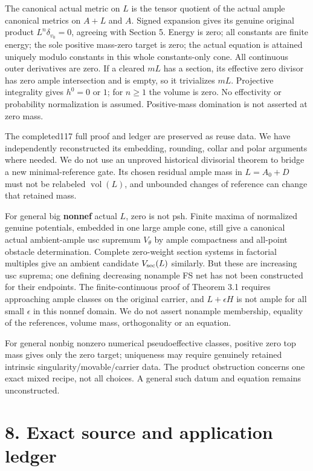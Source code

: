\documentclass[
  10pt,
]{article}
\begin{document}
The canonical actual metric on \(L\) is the tensor quotient of the
actual ample canonical metrics on \(A+L\) and \(A\). Signed expansion
gives its genuine original product \(L^n\delta_{v_0}=0\), agreeing with
Section 5. Energy is zero; all constants are finite energy; the sole
positive mass-zero target is zero; the actual equation is attained
uniquely modulo constants in this whole constants-only cone. All
continuous outer derivatives are zero. If a cleared \(mL\) has a
section, its effective zero divisor has zero ample intersection and is
empty, so it trivializes \(mL\). Projective integrality gives \(h^0=0\)
or \(1\); for \(n\ge1\) the volume is zero. No effectivity or
probability normalization is assumed. Positive-mass domination is not
asserted at zero mass.

The completed117 full proof and ledger are preserved as reuse data. We
have independently reconstructed its embedding, rounding, collar and
polar arguments where needed. We do not use an unproved historical
divisorial theorem to bridge a new minimal-reference gate. Its chosen
residual ample mass in \(L=A_0+D\) must not be relabeled
\(\operatorname{vol}(L)\), and unbounded changes of reference can change
that retained mass.

For general big \textbf{nonnef} actual \(L\), zero is not psh. Finite
maxima of normalized genuine potentials, embedded in one large ample
cone, still give a canonical actual ambient-ample usc supremum
\(V_\theta\) by ample compactness and all-point obstacle determination.
Complete zero-weight section systems in factorial multiples give an
ambient candidate \(V_{\rm sec}(L)\) similarly. But these are increasing
usc suprema; one defining decreasing nonample FS net has not been
constructed for their endpoints. The finite-continuous proof of Theorem
3.1 requires approaching ample classes on the original carrier, and
\(L+\epsilon H\) is not ample for all small \(\epsilon\) in this nonnef
domain. We do not assert nonample membership, equality of the
references, volume mass, orthogonality or an equation.

For general nonbig nonzero numerical pseudoeffective classes, positive
zero top mass gives only the zero target; uniqueness may require
genuinely retained intrinsic singularity/movable/carrier data. The
product obstruction concerns one exact mixed recipe, not all choices. A
general such datum and equation remains unconstructed.

\section{8. Exact source and application
ledger}\label{exact-source-and-application-ledger}
\end{document}
